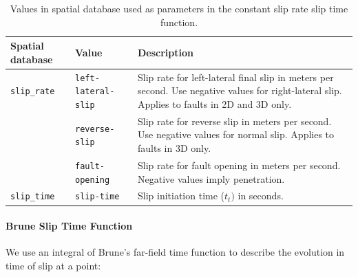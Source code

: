 \begin{table}[htbp]
\caption{Values in spatial database used
as parameters in the constant slip rate slip time function.}
\label{tab:const-slip-rate-db-params}
\begin{tabular}{llp{2.5in}}
\textbf{Spatial database} & \textbf{Value} & \textbf{Description}\\
\hline 
\texttt{slip\_rate} & \texttt{left-lateral-slip} & Slip rate for left-lateral final slip in meters per second. Use negative
values for right-lateral slip. Applies to faults in 2D and 3D only.\\
 & \texttt{reverse-slip} & Slip rate for reverse slip in meters per second. Use negative values
for normal slip. Applies to faults in 3D only.\\
 & \texttt{fault-opening} & Slip rate for fault opening in meters per second. Negative values
imply penetration.\\
\hline 
\texttt{slip\_time} & \texttt{slip-time} & Slip initiation time ($t_{t})$ in seconds.\\
\hline 
\end{tabular}
\end{table}

\paragraph{Brune Slip Time Function}

We use an integral of Brune's far-field time function \cite{Brune:1970}
to describe the evolution in time of slip at a point: 

